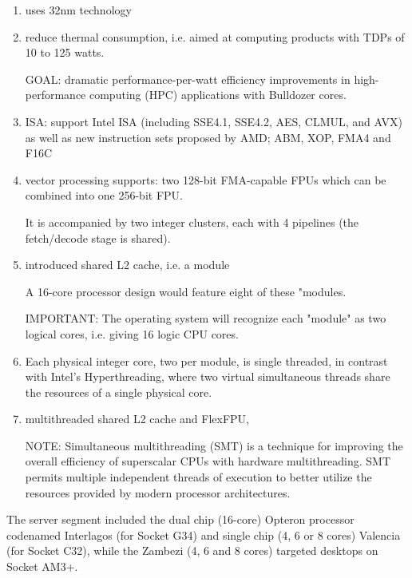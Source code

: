 \begin{enumerate}
  \item  uses 32nm technology
  
  \item reduce thermal consumption, i.e. aimed at computing products with TDPs of 10 to 125 watts.
  
  GOAL: dramatic performance-per-watt efficiency improvements in
  high-performance computing (HPC) applications with Bulldozer cores.
  
  \item ISA: support Intel ISA (including SSE4.1, SSE4.2, AES, CLMUL, and AVX)
   as well as new instruction sets proposed by AMD; ABM, XOP, FMA4 and F16C
  
  
  \item vector processing supports:  two 128-bit FMA-capable FPUs which can be combined into one 256-bit FPU.
  

  It is accompanied by two integer clusters, each with 4 pipelines (the fetch/decode stage is shared).

  \item introduced shared L2 cache, i.e. a module
  
   A 16-core processor design would feature eight of these "modules.
   
   IMPORTANT: The operating system will recognize each "module" as two logical cores, i.e. giving 16 logic CPU cores.
   
  \item Each physical integer core, two per module, is single threaded, in
  contrast with Intel's Hyperthreading, where two virtual simultaneous threads
  share the resources of a single physical core.
  
  \item multithreaded shared L2 cache and FlexFPU,
  
  \label{sec:SMT-simultaneous-multithreading}
  NOTE:  Simultaneous multithreading (SMT) is a technique for improving the overall efficiency of superscalar CPUs with hardware multithreading. SMT permits multiple independent threads of execution to better utilize the resources provided by modern processor architectures.

\end{enumerate}


The server segment included the dual chip (16-core) Opteron processor codenamed
Interlagos (for Socket G34) and single chip (4, 6 or 8 cores) Valencia (for
Socket C32), while the Zambezi (4, 6 and 8 cores) targeted desktops on Socket
AM3+.
 

